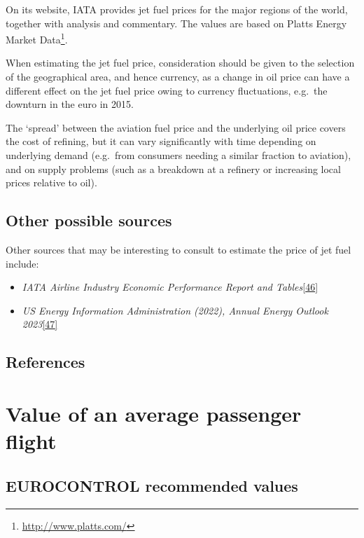 \documentclass[
  11pt,
  a4paper,
]{book}
\DeclareRobustCommand{\href}[2]{#2\footnote{\url{#1}}}
\begin{document}
On its website, IATA provides jet fuel prices for the major regions of
the world, together with analysis and commentary. The values are based
on \href{http://www.platts.com/}{Platts Energy Market Data}.

When estimating the jet fuel price, consideration should be given to the
selection of the geographical area, and hence currency, as a change in
oil price can have a different effect on the jet fuel price owing to
currency fluctuations, e.g.~the downturn in the euro in 2015.

The `spread' between the aviation fuel price and the underlying oil
price covers the cost of refining, but it can vary significantly with
time depending on underlying demand (e.g.~from consumers needing a
similar fraction to aviation), and on supply problems (such as a
breakdown at a refinery or increasing local prices relative to oil).

\hypertarget{other-possible-sources-2}{%
\section{Other possible sources}\label{other-possible-sources-2}}

Other sources that may be interesting to consult to estimate the price
of jet fuel include:

\begin{itemize}
\item
  \emph{IATA Airline Industry Economic Performance Report and
  Tables}\protect\hyperlink{ref-iataeconperf}{{[}46{]}}
\item
  \emph{US Energy Information Administration (2022), Annual Energy
  Outlook 2023}\protect\hyperlink{ref-eia2023}{{[}47{]}}
\end{itemize}

\hypertarget{references-21}{%
\section{References}\label{references-21}}

\hypertarget{sec-value-of-an-average-passenger-flight}{%
\chapter{Value of an average passenger
flight}\label{sec-value-of-an-average-passenger-flight}}

\hypertarget{eurocontrol-recommended-values-21}{%
\section{EUROCONTROL recommended
values}\label{eurocontrol-recommended-values-21}}
\end{document}
